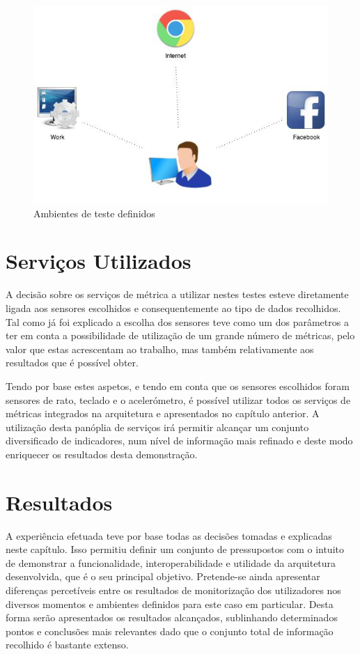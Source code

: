 \begin{figure}[htb]
   \centering
   \includegraphics[scale=0.5]{Images/ambientesestudo.jpg}
   \caption{Ambientes de teste definidos}
\end{figure}

\section{Serviços Utilizados}

A decisão sobre os serviços de métrica a utilizar nestes testes esteve diretamente ligada aos sensores escolhidos e consequentemente ao tipo de dados recolhidos. Tal como já foi explicado a escolha dos sensores teve como um dos parâmetros a ter em conta a possibilidade de utilização de um grande número de métricas, pelo valor que estas acrescentam ao trabalho, mas também relativamente aos resultados que é possível obter.

Tendo por base estes aspetos, e tendo em conta que os sensores escolhidos foram sensores de rato, teclado e o acelerómetro, é possível utilizar todos os serviços de métricas integrados na arquitetura e apresentados no capítulo anterior. A utilização desta panóplia de serviços irá permitir alcançar um conjunto diversificado de indicadores, num nível de informação mais refinado e deste modo enriquecer os resultados desta demonstração.

\section{Resultados}

A experiência efetuada teve por base todas as decisões tomadas e explicadas neste capítulo. Isso permitiu definir um conjunto de pressupostos com o intuito de demonstrar a funcionalidade, interoperabilidade e utilidade da arquitetura desenvolvida, que é o seu principal objetivo. Pretende-se ainda apresentar diferenças percetíveis entre os resultados de monitorização dos utilizadores nos diversos momentos e ambientes definidos para este caso em particular. Desta forma serão apresentados os resultados alcançados, sublinhando determinados pontos e conclusões mais relevantes dado que o conjunto total de informação recolhido é bastante extenso.

